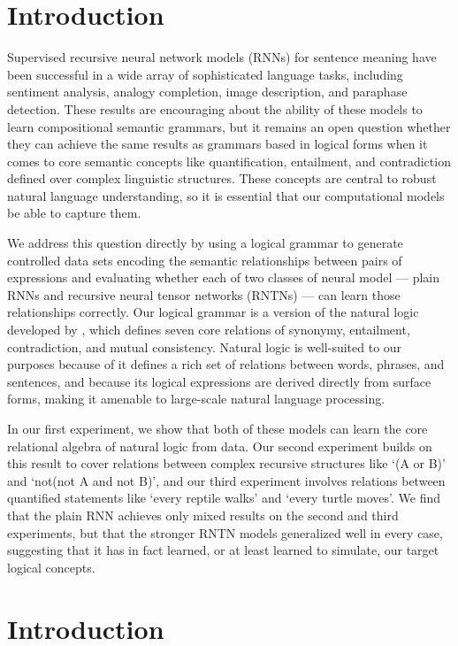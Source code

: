 \section{Introduction}\label{sec:intro}

Supervised recursive neural network models (RNNs) for sentence meaning
have been successful in a wide array of sophisticated language tasks,
including sentiment analysis, analogy completion, image description,
and paraphase detection. These results are encouraging about the
ability of these models to learn compositional semantic grammars, but
it remains an open question whether they can achieve the same results
as grammars based in logical forms when it comes to core semantic
concepts like quantification, entailment, and contradiction defined
over complex linguistic structures. These concepts are central to
robust natural language understanding, so it is essential that our
computational models be able to capture them.

We address this question directly by using a logical grammar to
generate controlled data sets encoding the semantic relationships
between pairs of expressions and evaluating whether each of two
classes of neural model --- plain RNNs and recursive neural tensor
networks (RNTNs) --- can learn those relationships correctly. Our
logical grammar is a version of the natural logic developed by
\cite{maccartney2009extended}, which defines seven core relations of
synonymy, entailment, contradiction, and mutual consistency. Natural
logic is well-suited to our purposes because of it defines a rich set
of relations between words, phrases, and sentences, and because its
logical expressions are derived directly from surface forms, making it
amenable to large-scale natural language processing.

In our first experiment, we show that both of these models can learn
the core relational algebra of natural logic from data. Our second
experiment builds on this result to cover relations between complex
recursive structures like `(A or B)' and `not(not A and not B)', and
our third experiment involves relations between quantified statements
like `every reptile walks' and `every turtle moves'. We find that the
plain RNN achieves only mixed results on the second and third
experiments, but that the stronger RNTN models generalized well in
every case, suggesting that it has in fact learned, or at least
learned to simulate, our target logical concepts.


\section{Introduction}

